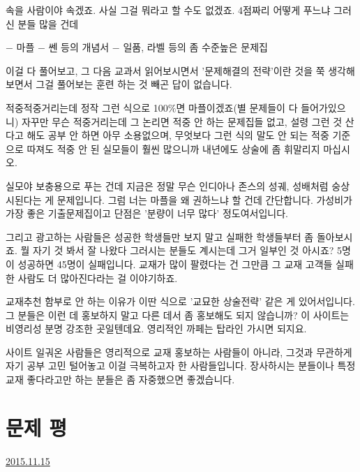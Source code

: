 \vspace{5mm}

속을 사람이야 속겠죠. 사실 그걸 뭐라고 할 수도 없겠죠.
4점짜리 어떻게 푸느냐 그러신 분들 많을 건데
\vspace{5mm}

$-$ 마플
$-$ 쎈 등의 개념서
$-$ 일품, 라벨 등의 좀 수준높은 문제집
\vspace{5mm}

이걸 다 풀어보고, 그 다음 교과서 읽어보시면서
'문제해결의 전략'이란 것을 쭉 생각해보면서 그걸 풀어보는 훈련 하는 것 빼곤 답이 없습니다.
\vspace{5mm}

적중적중거리는데 정작 그런 식으로 100$\%$면 마플이겠죠(별 문제들이 다 들어가있으니)
자꾸만 무슨 적중거리는데 그 논리면 적중 안 하는 문제집들 없고, 설령 그런 것 산다고 해도 공부 안 하면 아무 소용없으며,
무엇보다 그런 식의 말도 안 되는 적중 기준으로 따져도 적중 안 된 실모들이 훨씬 많으니까 내년에도 상술에 좀 휘말리지 마십시오.
\vspace{5mm}

실모야 보충용으로 푸는 건데 지금은 정말 무슨 인디아나 존스의 성궤, 성배처럼 숭상시된다는 게 문제입니다.
그럼 너는 마플을 왜 권하느냐 할 건데 간단합니다. 가성비가 가장 좋은 기출문제집이고 단점은 '분량이 너무 많다' 정도여서입니다.
\vspace{5mm}

그리고 광고하는 사람들은 성공한 학생들만 보지 말고 실패한 학생들부터 좀 돌아보시죠.
뭘 자기 것 봐서 잘 나왔다 그러시는 분들도 계시는데 그거 일부인 것 아시죠? 5명이 성공하면 45명이 실패입니다.
교재가 많이 팔렸다는 건 그만큼 그 교재 고객들 실패한 사람도 더 많아진다라는 걸 이야기하죠.
\vspace{5mm}

교재추천 함부로 안 하는 이유가 이딴 식으로 '교묘한 상술전략' 같은 게 있어서입니다.
그 분들은 이런 데 홍보하지 말고 다른 데서 좀 홍보해도 되지 않습니까?
이 사이트는 비영리성 분명 강조한 곳일텐데요. 영리적인 까페는 탑라인 가시면 되지요.
\vspace{5mm}

사이트 일궈온 사람들은 영리적으로 교재 홍보하는 사람들이 아니라, 그것과 무관하게 자기 공부 고민 털어놓고
이걸 극복하고자 한 사람들입니다. 장사하시는 분들이나 특정 교재 좋다라고만 하는 분들은 좀 자중했으면 좋겠습니다.
\vspace{5mm}






\section{문제 평}
\href{https://www.kockoc.com/Apoc/489714}{2015.11.15}

